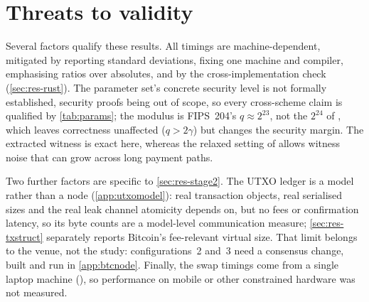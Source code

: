 
\section{Threats to validity}
\label{sec:res-validity}

\enlargethispage{\baselineskip}
Several factors qualify these results. All timings are machine-dependent, mitigated by
reporting standard deviations, fixing one machine and compiler, emphasising ratios over
absolutes, and by the cross-implementation check (\cref{sec:res-rust}). The parameter
set's concrete security level is not formally established, security proofs being out of
scope, so every cross-scheme claim is qualified by \cref{tab:params}; the modulus is
FIPS~204's $q\approx 2^{23}$, not the $2^{24}$ of \cite{esgin2020post}, which
leaves correctness unaffected ($q>2\gamma$) but changes the security margin. The extracted
witness is exact here, whereas the relaxed setting of \cite{esgin2020post} allows witness
noise that can grow across long payment paths.

Two further factors are specific to \cref{sec:res-stage2}. The UTXO ledger is a model
rather than a node (\cref{app:utxomodel}): real transaction objects, real serialised sizes
and the real leak channel atomicity depends on, but no fees or confirmation latency, so
its byte counts are a model-level communication measure; \cref{sec:res-txstruct}
separately reports Bitcoin's fee-relevant virtual size. That limit belongs to the venue, not the study: configurations~2 and~3 need a consensus change, built and run in
\cref{app:btcnode}. Finally, the swap timings come from a single laptop machine
(\stageTwoCpu{}), so performance on mobile or other constrained hardware was not
measured.
